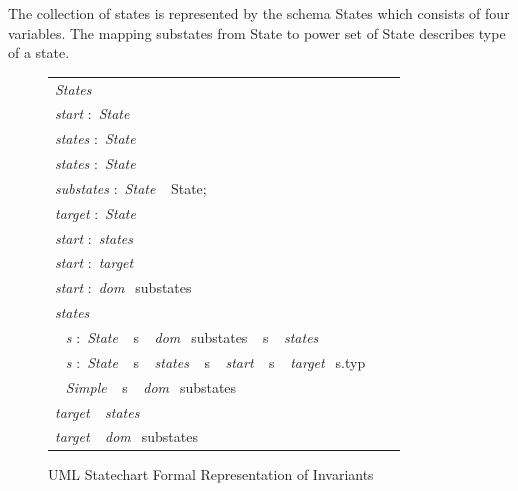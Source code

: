 The collection of states is represented by the schema
States which consists of four variables. The mapping
substates from State to power set of State describes type
of a state.
 \begin{figure}[ht!]
 	\begin{tabular}{lll}
 		\footnotesize                       
 		\textit{States}          \\
 		\footnotesize                       
 		\textit{start}          
 		$:$  \textit{State}\\
 		
 		\textit{states}          
 		$:$  \textit{State}\\
 		
 		\textit{states}           
 		$:$  \textit{State}\\
 		\footnotesize
 		\textit{substates}            $:$         \textit{State} $\ \  $ {State};       \\   
 		\footnotesize
 		\textit{target}             $:$         \textit{State}    \\
 		 \footnotesize                       
 		 \textit{start}           
 		 $:$  \textit{states}\\
 		  \footnotesize                       
 		  \textit{start}          
 		  $:$ \textit{target}\\
 		   \footnotesize                       
 		   \textit{start}           
 		   $:$  \textit{dom} $\ \  ${substates}\\
 		   
 		   \footnotesize                       
 		   \textit{states}          \\ 		
 		$\ \  $ \textit{s}      $:$     \textit{State} $\ \  $ {s} $\ \  $ \textit{dom} $\ \  ${substates} $\ \  $ {s} $\ \  $ \textit{states}        \\ 
 		$\ \  $ \textit{s}      $:$     \textit{State} $\ \  $ {s} $\ \  $ \textit{states} $\ \  $ {s} $\ \  $ \textit{start} $\ \  $ {s} $\ \  $ \textit{target}$\ \  $ {s.typ}\\ 
 		$\ \  $ \textit{Simple} $\ \  $ {s} $\ \  $ \textit{dom} $\ \  ${substates}\\
 		\footnotesize                       
 		\textit{target}  $\ \  $ \textit{states}        \\ 
 		\footnotesize                       
 		\textit{target}  $\ \  $ \textit{dom} $\ \  ${substates}\\	
 	\end{tabular}
 	\caption{UML Statechart Formal Representation of Invariants}
 	\label{statechart_formal_representation_invariants}
 	\end{figure}

